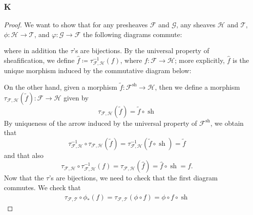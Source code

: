 \documentclass{article}
\newcommand{\fF}{\mathscr{F}}
\newcommand{\fG}{\mathscr{G}}
\newcommand{\fH}{\mathscr{H}}
\newcommand{\fT}{\mathscr{T}}
\DeclareMathOperator{\Hom}{Hom}
\DeclareMathOperator{\sh}{sh}
\begin{document}
\subsubsection{K}\label{2.4.K}
\begin{proof}
    We want to show that for any presheaves $\fF$ and $\fG$, any sheaves $\fH$ and $\fT$, $\phi:\fH\to \fT$, and $\varphi:\fG \to \fF$ the following diagrams commute:
    \begin{center}
    \end{center}
    where in addition the $\tau$'s are bijections. By the universal property of sheafification, we define $\hat f\coloneqq \tau_{\fF,\fH}^{-1}(f)$, where $f:\fF\to \fH$; more explicitly, $\hat f$ is the unique morphism induced by the commutative diagram below:
    \begin{center}
    \end{center}
    On the other hand, given a morphism $\tilde f:\fF^{\sh}\to \fH$, then we define a morphism $\tau_{\fF,\fH}(\tilde f):\fF\to \fH$ given by 
    \[
    \tau_{\fF,\fH}(\tilde f)=\tilde f\circ \sh
    \]
    By uniqueness of the arrow induced by the universal property of $\fF^{\sh}$, we obtain that 
    \[
    \tau_{\fF,\fH}^{-1}\circ \tau_{\fF,\fH}(\tilde f)=\tau_{\fF,\fH}^{-1}(\tilde f\circ \sh)=\tilde f
    \]
    and that also
    \[
    \tau_{\fF,\fH}\circ \tau_{\fF,\fH}^{-1}(f)=\tau_{\fF,\fH}(\hat f)=\hat f\circ \sh=f.
    \]
    Now that the $\tau$'s are bijections, we need to check that the first diagram commutes. We check that
    \begin{align*}
        \tau_{\fF,\fT}\circ \phi_*(f)=\tau_{\fF,\fT}(\phi\circ f)=\phi\circ f\circ \sh

\end{align*}
\end{proof}
\end{document}
